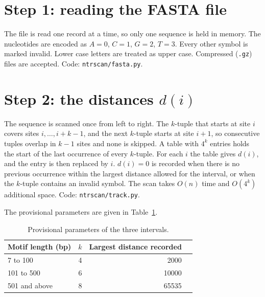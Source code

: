 \documentclass[11pt,a4paper]{article}
\begin{document}
\section{Step 1: reading the FASTA file}
The file is read one record at a time, so only one sequence is held in memory.
The nucleotides are encoded as $A=0$, $C=1$, $G=2$, $T=3$. Every other symbol is
marked invalid. Lower case letters are treated as upper case. Compressed
(\texttt{.gz}) files are accepted. Code: \texttt{ntrscan/fasta.py}.

\section{Step 2: the distances $d(i)$}
The sequence is scanned once from left to right. The $k$-tuple that starts at
site $i$ covers sites $i,\ldots,i+k-1$, and the next $k$-tuple starts at site
$i+1$, so consecutive tuples overlap in $k-1$ sites and none is skipped. A table
with $4^k$ entries holds the start of the last occurrence of every $k$-tuple.
For each $i$ the table gives $d(i)$, and the entry is then replaced by $i$.
$d(i)=0$ is recorded when there is no previous occurrence within the largest
distance allowed for the interval, or when the $k$-tuple contains an invalid
symbol. The scan takes $O(n)$ time and $O(4^k)$ additional space. Code:
\texttt{ntrscan/track.py}.

The provisional parameters are given in Table~\ref{tab:tiers}.
\begin{table}[h]\centering
\caption{Provisional parameters of the three intervals.}\label{tab:tiers}
\begin{tabular}{lrrr}
\toprule
Motif length (bp) & $k$ & Largest distance recorded \\
\midrule
7 to 100 & 4 & 2000 \\
101 to 500 & 6 & 10000 \\
501 and above & 8 & 65535 \\
\bottomrule
\end{tabular}
\end{table}
\end{document}
